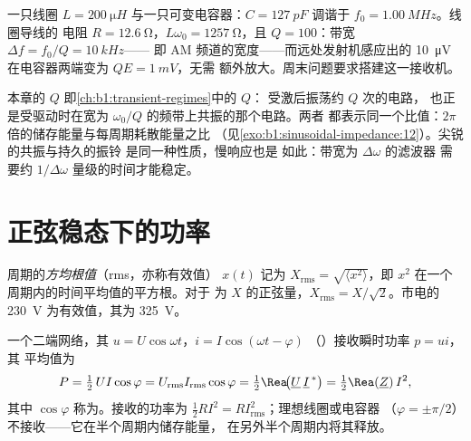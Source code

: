 \begin{example}[调谐收音机]\label{ex:b1:sinusoidal-impedance:radio}
一只线圈 $L = \qty{200}{\micro H}$ 与一只可变电容器：$C =
\qty{127}{pF}$ 调谐于 $f_0 = \qty{1.00}{MHz}$。线圈导线的
电阻 $R = \qty{12.6}{\ohm}$，$L\omega_0 = \qty{1257}{\ohm}$，且
$Q = 100$：带宽 $\Delta f = f_0/Q = \qty{10}{kHz}$——
即 AM 频道的宽度——而远处发射机感应出的 \qty{10}{\micro V} 
在电容器两端变为 $QE = \qty{1}{mV}$，无需
额外放大。周末问题要求搭建这一接收机。
\end{example}

\begin{remark}[再论 $Q$]\label{rem:b1:sinusoidal-impedance:Q}
本章的 $Q$ 即\cref{ch:b1:transient-regimes}中的 $Q$：
受激后振荡约 $Q$ 次的电路，
也正是受驱动时在宽为 $\omega_0/Q$ 的频带上共振的那个电路。两者
都表示同一个比值：$2\pi$ 倍的储存能量与每周期耗散能量之比
（见\cref{exo:b1:sinusoidal-impedance:12}）。尖锐的共振与持久的振铃
是同一种性质，慢响应也是
如此：带宽为 $\Delta\omega$ 的滤波器
需要约 $1/\Delta\omega$ 量级的时间才能稳定。
\end{remark}

\section{正弦稳态下的功率}

\begin{definition}[有效值]\label{def:b1:sinusoidal-impedance:rms}
周期的\emph{方均根值}（rms，亦称有效值）
$x(t)$ 记为 $X_{\mathrm{rms}} = \sqrt{\langle x^2\rangle}$，即
$x^2$ 在一个周期内的时间平均值的平方根。对于
为 $X$ 的正弦量，$X_{\mathrm{rms}} = X/\sqrt2$。市电的 \qty{230}{V}
为有效值，其为 \qty{325}{V}。
\end{definition}

\begin{theorem}[平均功率]\label{thm:b1:sinusoidal-impedance:power}
一个二端网络，其 $u = U\cos\omega t$，$i = I\cos(\omega t - \varphi)$
（）接收瞬时功率 $p = ui$，其
平均值为
\[
P = \tfrac12\,UI\cos\varphi = U_{\mathrm{rms}}I_{\mathrm{rms}}\cos\varphi
= \tfrac12\Rea\!\big(\underline U\,\underline I^{\,*}\big) = \tfrac12\Rea(\underline Z)\,I^2,
\]
其中 $\cos\varphi$ 称为\emph{}。接收的功率为
$\tfrac12 RI^2 = RI_{\mathrm{rms}}^2$；理想线圈或电容器
（$\varphi = \pm\pi/2$）不接收——它在半个周期内储存能量，
在另外半个周期内将其释放。
\end{theorem}

